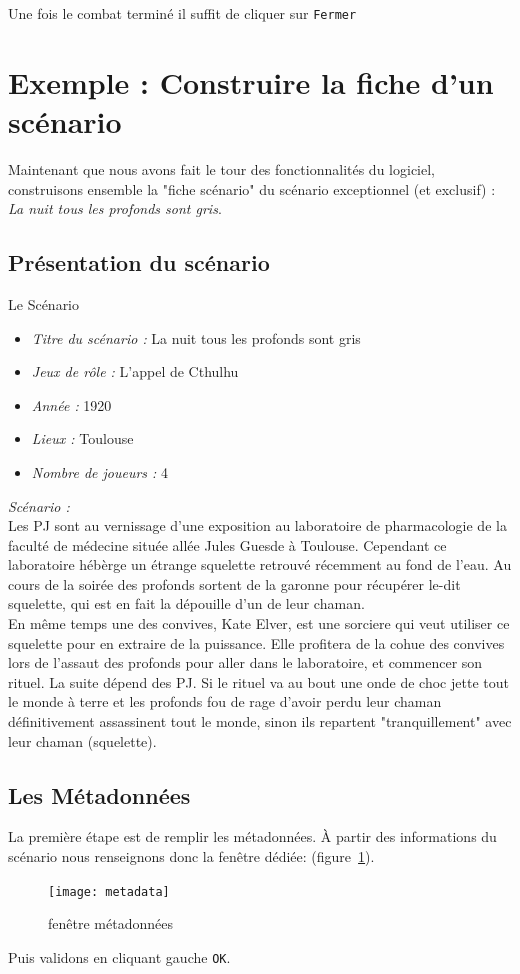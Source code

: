 \documentclass[a4paper,12pt]{article}
\newcommand*{\interfaceitem}[1]{\texttt{#1}}
\begin{document}
Une fois le combat terminé il suffit de cliquer sur \interfaceitem{Fermer}

\section{Exemple : Construire la fiche d'un scénario}
\label{sec:exem}

Maintenant que nous avons fait le tour des fonctionnalités du logiciel, construisons ensemble la "fiche scénario" du scénario exceptionnel (et exclusif) : \emph{La nuit tous les profonds sont gris}.

\subsection{Présentation du scénario}
\label{exemple_scenario}
Le Scénario
\begin{itemize}
    \item \emph{Titre du scénario :} La nuit tous les profonds sont gris
    \item \emph{Jeux de rôle :} L'appel de Cthulhu
    \item \emph{Année :} 1920
    \item \emph{Lieux :} Toulouse
    \item \emph{Nombre de joueurs : } 4
\end{itemize}

\emph{Scénario :}\\ 
Les PJ sont au vernissage d'une exposition au laboratoire de pharmacologie de la faculté de médecine située allée Jules Guesde à Toulouse. Cependant ce laboratoire hébèrge  un étrange squelette retrouvé récemment au fond de l'eau. Au cours de la soirée des profonds sortent de la garonne pour récupérer le-dit squelette, qui est en fait la dépouille d'un de leur chaman.
\\
En même temps une des convives, Kate Elver, est une sorciere qui veut utiliser ce squelette pour en extraire de la puissance. Elle profitera de la cohue des convives lors de l'assaut des profonds pour aller dans le laboratoire, et commencer son rituel. La suite dépend des PJ. Si le rituel va au bout une onde de choc jette tout le monde à terre et les profonds fou de rage d'avoir perdu leur chaman définitivement assassinent tout le monde, sinon ils repartent "tranquillement" avec leur chaman (squelette).

\subsection{Les Métadonnées}
La première étape est de remplir les métadonnées. À partir des informations du scénario nous renseignons donc la fenêtre dédiée: (figure~\ref{metadata}).
\begin{figure}[h!]
    \texttt{[image: metadata]}
    \caption{fenêtre métadonnées}
    \label{metadata}
\end{figure}
Puis validons en cliquant gauche \interfaceitem{OK}.
\end{document}
